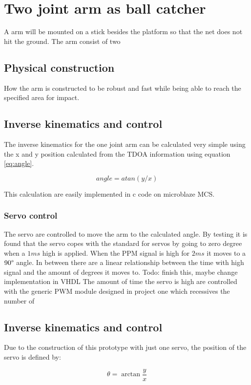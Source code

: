 \chapter{Two joint arm as ball catcher}
\label{catcherArm}
	A arm will be mounted on a stick besides the platform so that the net does not hit the ground. The arm consist of two

\section{Physical construction}
\label{armConstruction}
	How the arm is constructed to be robust and fast while being able to reach the specified area for impact.

\section{Inverse kinematics and control }
\label{kinematics}
The inverse kinematics for the one joint arm can be calculated very simple using the x and y position calculated from the TDOA information using equation \ref{eq:angle}.

\begin{equation}
	angle = atan(y/x)
	\label{eq:angle}
\end{equation}

This calculation are easily implemented in c code on microblaze MCS.

\subsection{Servo control}
The servo are controlled to move the arm to the calculated angle. By testing it is found that the servo copes with the standard for servos by going to zero degree when a $1\si{ms}$ high is applied. When the PPM signal is high for $2\si{ms}$ it moves to a $90\degree$ angle. In between there are a linear relationship between the time with high signal and the amount of degrees it moves to.
Todo: finish this, maybe change implementation in VHDL
The amount of time the servo is high are controlled with the generic PWM module designed in project one which recessives the number of



	\section{Inverse kinematics and control}
		Due to the construction of this prototype with just one servo, the position of the servo is defined by:

		$$\theta = \arctan\frac{y}{x}$$

